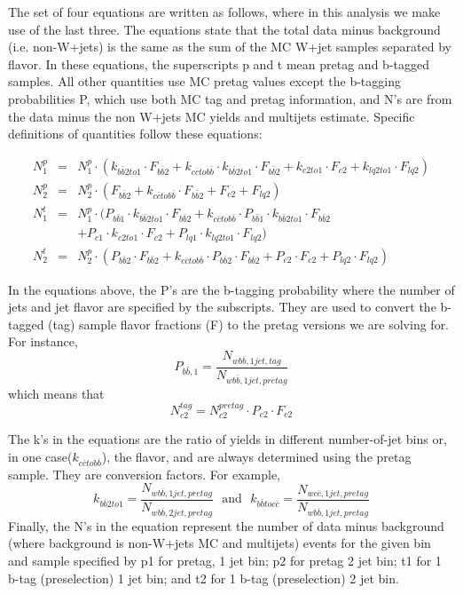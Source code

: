 The set of four equations are written as follows, where in this analysis we make use of the last three.  The equations state that the total data minus background (i.e. non-W+jets) is the same as the sum of the MC W+jet samples separated by flavor.  In these equations, the superscripts p and t mean pretag and b-tagged samples.  All other quantities use MC pretag values except the b-tagging probabilities P, which use both MC tag and pretag information, and N's are from the data minus the non W+jets MC yields and multijets estimate.  Specific definitions of quantities follow these equations:

\begin{eqnarray*}
N^{p}_1 &=& N^{p}_1 \cdot (k_{b\bar{b}2to1} \cdot F_{b\bar{b}2} +  k_{c\bar{c}tob\bar{b}} \cdot k_{b\bar{b}2to1} \cdot F_{b\bar{b}2}  + k_{c2to1} \cdot F_{c2} + k_{lq2to1} \cdot F_{lq2})\\
N^{p}_2 &=& N^{p}_2 \cdot (F_{b\bar{b}2} +  k_{c\bar{c}tob\bar{b}} \cdot F_{b\bar{b}2}  + F_{c2}  + F_{lq2}) \\
N^{t}_1 &=& N^{p}_1 \cdot (P_{b\bar{b}1}\cdot k_{b\bar{b}2to1} \cdot F_{b\bar{b}2} +  k_{c\bar{c}tob\bar{b}} \cdot P_{b\bar{b}1} \cdot k_{b\bar{b}2to1} \cdot F_{b\bar{b}2}  \\
&&+ P_{c1} \cdot  k_{c2to1} \cdot F_{c2} + P_{lq1}  \cdot k_{lq2to1} \cdot F_{lq2}) \\
N^{t}_2 &=& N^{p}_2 \cdot ( P_{b\bar{b}2}\cdot F_{b\bar{b}2} +  k_{c\bar{c}tob\bar{b}} \cdot P_{b\bar{b}2} \cdot F_{b\bar{b}2}  + P_{c2} \cdot F_{c2} + P_{lq2} \cdot F_{lq2})
\end{eqnarray*}

In the equations above, the P's are the b-tagging probability where the number of jets and jet flavor are specified by the subscripts.  They are used to convert the b-tagged (tag) sample flavor fractions (F) to the pretag versions we are solving for.  For instance,
\begin{equation}P_{b\bar{b},1} = \frac{N_{wb\bar{b}, 1jet, tag}}{N_{wb\bar{b}, 1jet, pretag}} \end{equation}
which means that
\begin{equation}N^{tag}_{c2} = N^{pretag}_{c2} \cdot P_{c2} \cdot F_{c2} \end{equation}

The k's in the equations are the ratio of yields in different number-of-jet bins or, in one case($k_{c\bar{c}tob\bar{b}}$), the flavor, and are always determined using the pretag sample.  They are conversion factors. For example,
\begin{equation}k_{b\bar{b}2to1} = \frac{N_{wb\bar{b}, 1jet, pretag}}{N_{wb\bar{b},2jet, pretag}} ~~~\textrm{and} ~~~k_{b\bar{b}toc\bar{c}} = \frac{N_{wc\bar{c}, 1jet, pretag}}{N_{wb\bar{b},1jet, pretag}}\end{equation}
Finally, the N's in the equation represent the number of data minus background (where background is non-W+jets MC and multijets) events for the given bin and sample specified by p1 for pretag, 1 jet bin; p2 for pretag 2 jet bin; t1 for 1 b-tag (preselection) 1 jet bin; and t2 for 1 b-tag (preselection) 2 jet bin.

